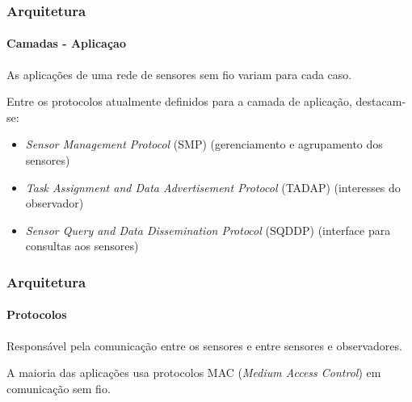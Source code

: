 \documentclass[notes]{beamer}
\begin{document}
\begin{frame}
\label{slide_42}
\frametitle{Arquitetura}
\framesubtitle{Camadas - Aplicaçao}

\begin{block}

As aplicações de uma rede de sensores sem fio variam para cada caso.

\end{block} \pause

\begin{block}

Entre os protocolos atualmente definidos para a camada de aplicação, destacam-se: \pause

\begin{itemize}

\item \textit{Sensor Management Protocol} (SMP) (gerenciamento e agrupamento dos sensores) \pause
\item \textit{Task Assignment and Data Advertisement Protocol}   (TADAP) (interesses do observador) \pause
\item \textit{Sensor Query and Data Dissemination Protocol} (SQDDP) (interface para consultas aos sensores)

\end{itemize}

\end{block}

\end{frame}

\begin{frame}
\label{slide_43}
\frametitle{Arquitetura}
\framesubtitle{Protocolos}

\begin{block}

Responsável pela comunicação entre os sensores e entre sensores e observadores. 
\end{block} \pause

\begin{block}

A maioria das aplicações usa protocolos MAC (\textit{Medium Access Control}) em comunicação sem fio. 

\end{block}

\end{frame}
\end{document}

